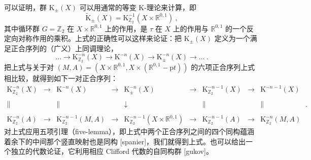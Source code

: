 \documentclass[11pt,a4paper]{ctexart}
\begin{document}
可以证明，群 \({\mathrm K}_{\pm}(X)\) 可以用通常的等变 K-理论来计算，即 \[\widetilde{{\mathrm K}}_{\pm}(X)={\mathrm K}^{-1}_{{\mathbb{Z}}_2}(X\times{\mathbb{R}}^{0,1})\ ,\] 其中循环群 \(G={\mathbb{Z}}_2\) 在 \(X\times{\mathbb{R}}^{0,1}\) 上的作用，是 \(\tau\) 在 \(X\) 上的作用与 \({\mathbb{R}}^{0,1}\) 的一个反定向对称作用的乘积。上式的正确性可以这样来论证：把 \({\mathrm K}_{\pm}(X)\) 定义为一个满足正合序列的（广义）上同调理论， \[\ldots\longrightarrow{\mathrm K}^{-n}_{{\mathbb{Z}}_2}(X)\longrightarrow{\mathrm K}^{-n}(X)
\longrightarrow{\mathrm K}^{-n}_{\pm}(X)\longrightarrow\ldots \ .\] 把上式与关于对 \((M,A)=(X\times{\mathbb{R}}^{0,1},X\times({\mathbb{R}}^{0,1}-{\mathrm  pt}))\) 的六项正合序列上式相比较，就得到如下一对正合序列： \[{\begin{array}{ccccccccc}
{\mathrm K}^{-n}_{{\mathbb{Z}}_2}(X)&\rightarrow&{\mathrm K}^{-n}(X)&
\rightarrow&{\mathrm K}^{-n}_{\pm}(X)&\rightarrow&{\mathrm K}^{-n-1}_{{\mathbb{Z}}_2}(X)&
\rightarrow&{\mathrm K}^{-n-1}(X)\\ & & & & & & & &\\\parallel& &\parallel& &\downarrow&
&\parallel& &\parallel\\ & & & & & & & &\\
{\mathrm K}^{-n}_{{\mathbb{Z}}_2}(A)&\rightarrow&{\mathrm K}^{-n-1}_{{\mathbb{Z}}_2}(M,A)&
\rightarrow&{\mathrm K}^{-n-1}_{{\mathbb{Z}}_2}(X\times{\mathbb{R}}^{0,1})&
\rightarrow&{\mathrm K}^{-n-1}_{{\mathbb{Z}}_2}(A)&
\rightarrow&{\mathrm K}^{-n}_{{\mathbb{Z}}_2}(M,A)\end{array}} \ .\] 对上式应用五项引理（five-lemma），即上式中两个正合序列之间的四个同构蕴涵着余下的中间那个竖直映射也是同构 [spanier]，我们就得到上式。也可以给出一个独立的代数论证，它利用相应 Clifford 代数的自同构群 [gukov]。
\end{document}
